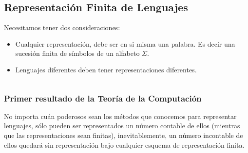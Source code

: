 \subsection{Representación Finita de Lenguajes}
Necesitamos tener dos consideraciones:
\begin{itemize}
\item Cualquier representación, debe ser en si misma una palabra. Es decir una sucesión finita de símbolos de un alfabeto $\Sigma$.
\item Lenguajes diferentes deben tener representaciones diferentes.
\end{itemize}
\begin{center}

\begin{figure}[!ht]
  \centering
  \begin{minipage}{0.3\textwidth}
  \end{minipage}
  ${ }$
  \centering
  \begin{minipage}{0.2\textwidth}
  \end{minipage}
\end{figure}

\end{center}


\subsubsection{Primer resultado de la Teoría de la Computación}
No importa cuán poderosos sean los métodos que conocemos para representar lenguajes, sólo pueden ser representados un número contable de ellos (mientras que las representaciones sean finitas), inevitablemente, un número incontable de ellos quedará sin representación bajo cualquier esquema de representación finita. 
